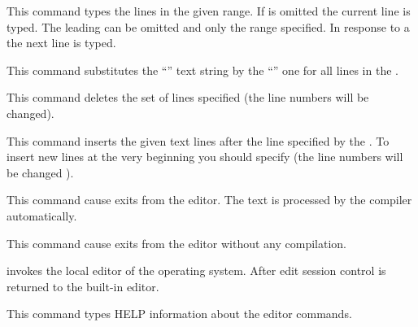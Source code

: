  
This command types the lines in the given range. 
If  is omitted the current line is typed.
The leading   can be omitted and only the range specified.
In response to a  the next line is typed.
 
 
This command substitutes the ``'' text string
by the ``'' one for all lines in the .
 
 
This command deletes the set of lines specified
(the line numbers will be changed).
 
 
This command inserts the given text lines after the line
specified by the .
To insert new lines at the very beginning you should
specify  (the line numbers will be changed ).
 
 
This command cause exits from the editor. The text is processed
by the \COMIS{} compiler automatically.
 
 
This command cause exits from the editor without any compilation.
 
 
\COMIS{} invokes the local editor of the operating system.
After edit session control is returned to the built-in editor.
 
 
This command types HELP information about the editor commands.
 
